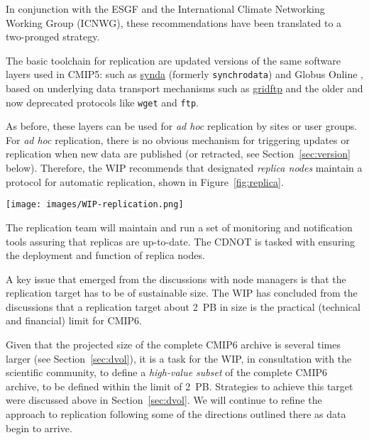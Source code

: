 \documentclass[gmd,manuscript]{copernicus}
\newcommand{\pipref}[1] {\citep{ref:#1}}
\newcommand{\figref}[1] {\mbox{Figure   \ref{fig:#1}}}
\newcommand{\secref}[1] {\mbox{Section  \ref{sec:#1}}}
\begin{document}
In conjunction with the ESGF and the International Climate Networking
Working Group (ICNWG), these recommendations have been translated to a
two-pronged strategy.

The basic toolchain for replication are updated versions of the same
software layers used in CMIP5: such as
\href{https://github.com/Prodiguer/synda}{synda} (formerly
\texttt{synchrodata}) and Globus Online \pipref{allenetal2012}, based
on underlying data transport mechanisms such as
\href{https://goo.gl/Z8xcfE}{gridftp} and the older and now deprecated
protocols like \texttt{wget} and \texttt{ftp}.

As before, these layers can be used for \emph{ad hoc} replication by
sites or user groups. For \emph{ad hoc} replication, there is no
obvious mechanism for triggering updates or replication when new data
are published (or retracted, see \secref{version} below). Therefore,
the WIP recommends that designated \emph{replica nodes} maintain a
protocol for automatic replication, shown in \figref{replica}.


\begin{figure*}
  \begin{center}
    \texttt{[image: images/WIP-replication.png]}
  \end{center}
  \caption{CMIP6 replication from data nodes to replica centers and
    between replica centers coordinated by a CMIP6 replication team.}
  \label{fig:replica}
\end{figure*}

The replication team will maintain and run a set of monitoring and
notification tools assuring that replicas are up-to-date. The CDNOT is
tasked with ensuring the deployment and function of replica nodes.

A key issue that emerged from the discussions with node managers is
that the replication target has to be of sustainable size. The WIP has
concluded from the discussions that a replication target about 2~PB in
size is the practical (technical and financial) limit for CMIP6.


Given that the projected size of the complete CMIP6 archive is several
times larger (see \secref{dvol}), it is a task for the WIP, in
consultation with the scientific community, to define a
\emph{high-value subset} of the complete CMIP6 archive, to be defined
within the limit of 2~PB. Strategies to achieve this target were
discussed above in \secref{dvol}. We will continue to refine the
approach to replication following some of the directions outlined
there as data begin to arrive.
\end{document}
